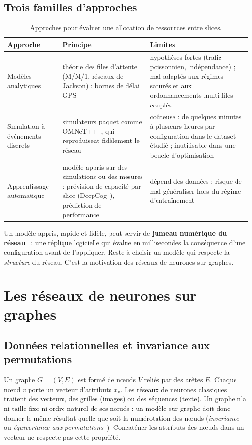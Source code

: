 \subsection{Trois familles d'approches}
\begin{table}[H]
\centering\small
\begin{tabularx}{\linewidth}{@{}>{\raggedright}p{2.6cm}>{\raggedright}X>{\raggedright\arraybackslash}X@{}}
\toprule
Approche & Principe & Limites\\
\midrule
Modèles analytiques & théorie des files d'attente (M/M/1, réseaux de Jackson) ; bornes de délai GPS~\cite{gps,kleinrock} & hypothèses fortes (trafic poissonnien, indépendance) ; mal adaptés aux régimes saturés et aux ordonnancements multi-files couplés\\
Simulation à événements discrets & simulateurs paquet comme OMNeT++~\cite{omnet}, qui reproduisent fidèlement le réseau & coûteuse : de quelques minutes à plusieurs heures par configuration dans le dataset étudié ; inutilisable dans une boucle d'optimisation\\
Apprentissage automatique & modèle appris sur des simulations ou des mesures : prévision de capacité par slice (DeepCog~\cite{deepcog}), prédiction de performance~\cite{routenet} & dépend des données ; risque de mal généraliser hors du régime d'entraînement\\
\bottomrule
\end{tabularx}
\caption{Approches pour évaluer une allocation de ressources entre slices.}
\label{tab:approaches}
\end{table}
Un modèle appris, rapide et fidèle, peut servir de \textbf{jumeau numérique du réseau}~\cite{digitaltwin} : une réplique logicielle qui évalue en millisecondes la conséquence d'une configuration avant de l'appliquer. Reste à choisir un modèle qui respecte la \emph{structure} du réseau. C'est la motivation des réseaux de neurones sur graphes.

\section{Les réseaux de neurones sur graphes}\label{sec:sota-gnn}
\subsection{Données relationnelles et invariance aux permutations}
Un graphe $G=(V,E)$ est formé de nœuds $V$ reliés par des arêtes $E$. Chaque nœud $v$ porte un vecteur d'attributs $x_v$. Les réseaux de neurones classiques traitent des vecteurs, des grilles (images) ou des séquences (texte). Un graphe n'a ni taille fixe ni ordre naturel de ses nœuds : un modèle sur graphe doit donc donner le même résultat quelle que soit la numérotation des nœuds (\emph{invariance} ou \emph{équivariance aux permutations}~\cite{battaglia}). Concaténer les attributs des nœuds dans un vecteur ne respecte pas cette propriété.

